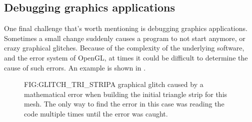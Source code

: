 \subsection{Debugging graphics applications}

One final challenge that's worth mentioning is debugging graphics applications.
Sometimes a small change suddenly causes a program to not start anymore,
or crazy graphical glitches.
Because of the complexity of the underlying software,
and the error system of OpenGL,
at times it could be difficult to determine the cause of such errors.
An example is shown in .

\begin{figure}[Graphical glitch \textemdash Triangle strip]{FIG:GLITCH_TRI_STRIP}{A graphical glitch caused by a mathematical error when building the initial triangle strip for this mesh. The only way to find the error in this case was reading the code multiple times until the error was caught.}
\end{figure}

  
